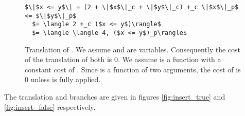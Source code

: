 \begin{figure}[H]
\caption{Translation of .
\label{fig:fxy}
We assume  and  are variables.
Consequently the cost of the translation of both is 0.
We assume \T{<=} is a function with a constant cost of .
Since \T{<=} is a function of two arguments, the cost of \T{<=} is 0 unless \T{<=} is fully applied.
}
\begin{lstlisting}
$\|$x <= y$\| = (2 + \|$x$\|_c + \|$y$\|_c) +_c \|$x$\|_p$ <= $\|$y$\|_p$
  $= \langle 2 +_c ($x <= y$)\rangle$
  $= \langle \langle 4, ($x <= y$)_p\rangle$
\end{lstlisting}
\end{figure}

The translation  and  branches are given in figures \ref{fig:insert_true} and \ref{fig:insert_false} respectively.

